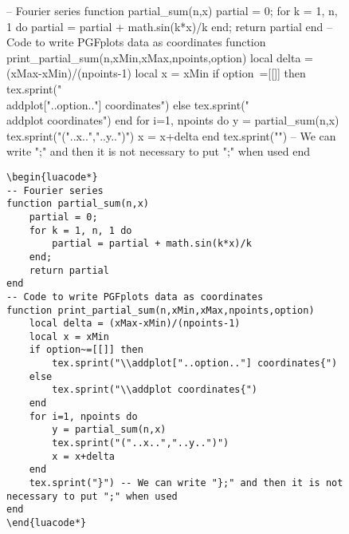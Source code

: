 \begin{figure}[htp]
\begin{scriptexample}[]{}
\begin{luacode*}
-- Fourier series
function partial_sum(n,x)
    partial = 0;
    for k = 1, n, 1 do 
        partial = partial + math.sin(k*x)/k 
    end;
    return partial
end
-- Code to write PGFplots data as coordinates
function print_partial_sum(n,xMin,xMax,npoints,option)
    local delta = (xMax-xMin)/(npoints-1)
    local x = xMin
    if option~=[[]] then
        tex.sprint("\\addplot["..option.."] coordinates{")
    else
        tex.sprint("\\addplot coordinates{")
    end
    for i=1, npoints do
        y = partial_sum(n,x)
        tex.sprint("("..x..","..y..")")
        x = x+delta
    end
    tex.sprint("}") -- We can write "};" and then it is not necessary to put ";" when used
end
\end{luacode*}
\newcommand\addLUADEDplot[5][]{\directlua{print_partial_sum(#2,#3,#4,#5,[[#1]])}}
\centering
\pgfplotsset{width=15cm, height=7cm}  
\begin{verbatim}
\begin{luacode*}
-- Fourier series
function partial_sum(n,x)
    partial = 0;
    for k = 1, n, 1 do 
        partial = partial + math.sin(k*x)/k 
    end;
    return partial
end
-- Code to write PGFplots data as coordinates
function print_partial_sum(n,xMin,xMax,npoints,option)
    local delta = (xMax-xMin)/(npoints-1)
    local x = xMin
    if option~=[[]] then
        tex.sprint("\\addplot["..option.."] coordinates{")
    else
        tex.sprint("\\addplot coordinates{")
    end
    for i=1, npoints do
        y = partial_sum(n,x)
        tex.sprint("("..x..","..y..")")
        x = x+delta
    end
    tex.sprint("}") -- We can write "};" and then it is not necessary to put ";" when used
end
\end{luacode*}
\end{verbatim}
\end{scriptexample}
\end{figure}

